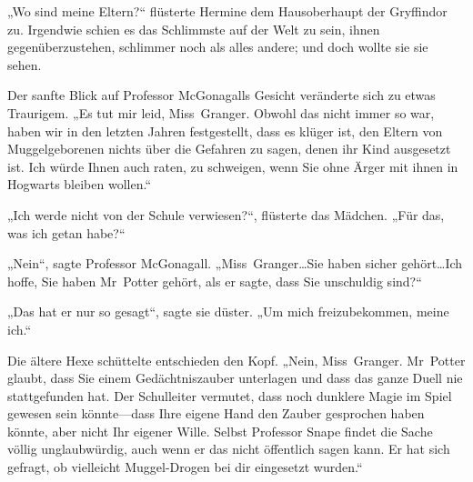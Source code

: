 „Wo sind meine Eltern?“ flüsterte Hermine dem Hausoberhaupt der Gryffindor zu. Irgendwie schien es das Schlimmste auf der Welt zu sein, ihnen gegenüberzustehen, schlimmer noch als alles andere; und doch wollte sie sie sehen.

Der sanfte Blick auf Professor McGonagalls Gesicht veränderte sich zu etwas Traurigem. „Es tut mir leid, Miss~Granger. Obwohl das nicht immer so war, haben wir in den letzten Jahren festgestellt, dass es klüger ist, den Eltern von Muggelgeborenen nichts über die Gefahren zu sagen, denen ihr Kind ausgesetzt ist. Ich würde Ihnen auch raten, zu schweigen, wenn Sie ohne Ärger mit ihnen in Hogwarts bleiben wollen.“

„Ich werde nicht von der Schule verwiesen?“, flüsterte das Mädchen. „Für das, was ich getan habe?“

„Nein“, sagte Professor McGonagall. „Miss~Granger…Sie haben sicher gehört…Ich hoffe, Sie haben Mr~Potter gehört, als er sagte, dass Sie unschuldig sind?“

„Das hat er nur so gesagt“, sagte sie düster. „Um mich freizubekommen, meine ich.“

Die ältere Hexe schüttelte entschieden den Kopf. „Nein, Miss~Granger. Mr~Potter glaubt, dass Sie einem Gedächtniszauber unterlagen und dass das ganze Duell nie stattgefunden hat. Der Schulleiter vermutet, dass noch dunklere Magie im Spiel gewesen sein könnte—dass Ihre eigene Hand den Zauber gesprochen haben könnte, aber nicht Ihr eigener Wille. Selbst Professor Snape findet die Sache völlig unglaubwürdig, auch wenn er das nicht öffentlich sagen kann. Er hat sich gefragt, ob vielleicht Muggel-Drogen bei dir eingesetzt wurden.“

